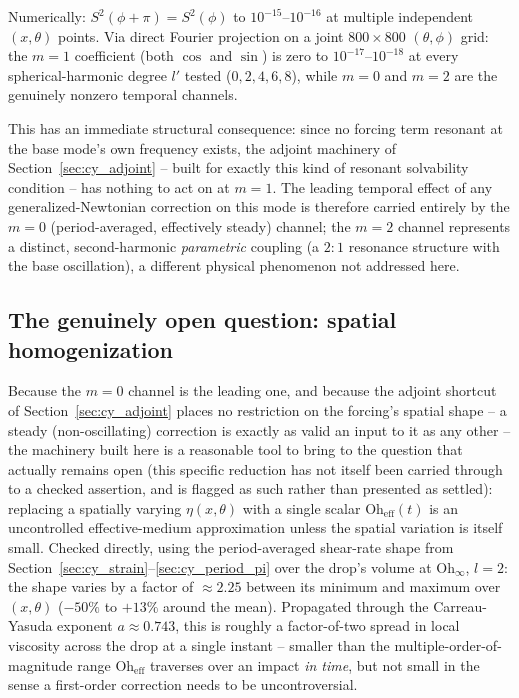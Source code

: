 \begin{notebox}
Numerically: $S^2(\phi+\pi)=S^2(\phi)$ to $10^{-15}$--$10^{-16}$ at multiple
independent $(x,\theta)$ points. Via direct Fourier projection on a joint
$800\times800$ $(\theta,\phi)$ grid: the $m=1$ coefficient (both $\cos$ and
$\sin$) is zero to $10^{-17}$--$10^{-18}$ at every spherical-harmonic degree
$l'$ tested ($0,2,4,6,8$), while $m=0$ and $m=2$ are the genuinely nonzero
temporal channels.
\end{notebox}

This has an immediate structural consequence: since no forcing term
resonant at the base mode's own frequency exists, the adjoint machinery of
Section~\ref{sec:cy_adjoint} -- built for exactly this kind of resonant
solvability condition -- has nothing to act on at $m=1$. The leading
temporal effect of any generalized-Newtonian correction on this mode is
therefore carried entirely by the $m=0$ (period-averaged, effectively
steady) channel; the $m=2$ channel represents a distinct, second-harmonic
\emph{parametric} coupling (a $2\!:\!1$ resonance structure with the base
oscillation), a different physical phenomenon not addressed here.

\subsection{The genuinely open question: spatial homogenization}
\label{sec:cy_temporal}

Because the $m=0$ channel is the leading one, and because the adjoint
shortcut of Section~\ref{sec:cy_adjoint} places no restriction on the
forcing's spatial shape -- a steady (non-oscillating) correction is exactly
as valid an input to it as any other -- the machinery built here is a
reasonable tool to bring to the question that actually remains open (this
specific reduction has not itself been carried through to a checked
assertion, and is flagged as such rather than presented as settled): replacing a
spatially varying $\eta(x,\theta)$ with a single scalar
$\mathrm{Oh}_{\mathrm{eff}}(t)$ is an uncontrolled effective-medium
approximation unless the spatial variation is itself small. Checked
directly, using the period-averaged shear-rate shape from
Section~\ref{sec:cy_strain}--\ref{sec:cy_period_pi} over the drop's volume
at $\mathrm{Oh}_\infty$, $l=2$: the shape varies by a factor of
$\approx 2.25$ between its minimum and maximum over $(x,\theta)$ ($-50\%$ to
$+13\%$ around the mean). Propagated through the Carreau-Yasuda exponent
$a\approx0.743$, this is roughly a factor-of-two spread in local viscosity
across the drop at a single instant -- smaller than the multiple-order-of-
magnitude range $\mathrm{Oh}_{\mathrm{eff}}$ traverses over an impact
\emph{in time}, but not small in the sense a first-order correction needs
to be uncontroversial.

